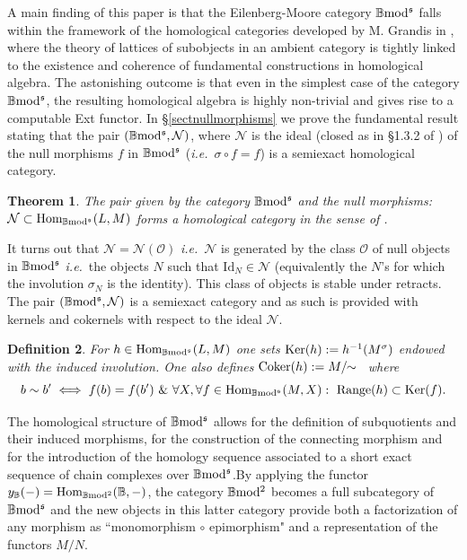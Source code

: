 \documentclass[12pt]{article}
\newtheorem{thm}{Theorem}[section]
\newtheorem{defn}[thm]{Definition}
\def\Hom{{\rm Hom}}
\def\id{{\rm id}}
\def\Ker{{\rm Ker}}
\def\coker{{\rm Coker}}
\def\B{{\mathbb B}}
\def\cN{{\mathcal N}}
\def\cO{{\mathcal O}}
\newcommand{\ie}{{\it i.e.\/}\ }
\def\id{{\mbox{Id}}}
\def\Hom {{\mbox{Hom}}}
\def\bm2{{\rm \B mod^2}}
\def\b2{{\rm \B mod^{\mathfrak s}}}
\begin{document}
A main finding of this paper  is that the Eilenberg-Moore category $\b2$  falls  within the framework of the homological categories developed by M. Grandis in \cite{gra1}, where the theory of lattices of subobjects in an ambient category is tightly linked to the existence and coherence of fundamental constructions in  homological algebra. The astonishing outcome is that even in the simplest case of the category $\b2$, the resulting homological algebra is highly non-trivial and gives rise to a computable Ext functor.\newline 
In \S\ref{sectnullmorphisms} we prove  the fundamental result  stating   that the pair $(\b2,\cN)$, where $\cN$ is the ideal (closed as in \S 1.3.2 of \cite{gra1}) of the null morphisms  $f$ in $\b2$ (\ie  $\sigma\circ f=f$)  is a semiexact homological category.
\begin{thm}\label{homologicalintro}
The pair given by the category $\b2$ and the null morphisms: $\cN\subset \Hom_\b2(L,M)$
  forms a homological category in the sense of \cite{gra,gra1}. 
\end{thm}
 It turns out that $\cN=\cN(\cO)$ \ie $\cN$ is generated by the class $\cO$ of  null objects in $\b2$ \ie the objects $N$ such that $\id_N\in \cN$ (equivalently the $N$'s for which the involution $\sigma_N$ is the identity).  This class of objects is stable under retracts.
   The pair $(\b2,\cN)$ is a semiexact category and as such is provided with kernels and cokernels with respect to the ideal $\cN$.
     \begin{defn}\label{ker&coker intro} For $h\in \Hom_\b2(L,M)$  one sets
 $\Ker(h):=h^{-1} (M^\sigma) $
endowed with the induced involution.  One also defines $\coker(h):=M/\!\!\sim$ ~where
 \begin{equation}\label{cokernelb2intro}
 b\sim b'\iff f(b)=f(b')~\&~\forall X, \forall f\in \Hom_\b2(M,X):~ {\rm Range}(h)\subset \Ker(f).
\end{equation}
\end{defn}
The homological structure of $\b2$ allows for the definition of subquotients and their induced morphisms, for the construction of the connecting morphism and for the introduction of the homology sequence associated to a short exact sequence of chain complexes over $\b2$.\newline By applying the functor $y_\B(-)=\Hom_\bm2(\B,-)$,
the category $\bm2$ becomes  a full subcategory of $\b2$ and the new objects in this latter category provide both a factorization of any morphism as ``monomorphism $\circ$ epimorphism" and a representation of the functors $M/N$. 
\end{document}
